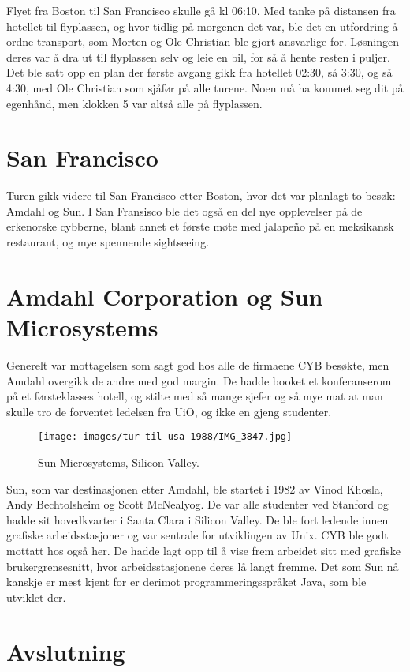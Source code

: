 Flyet fra Boston til San Francisco skulle gå kl 06:10. Med tanke på distansen fra hotellet til flyplassen, og hvor tidlig på morgenen det var, ble det en utfordring å ordne transport, som Morten og Ole Christian ble gjort ansvarlige for. Løsningen deres var å dra ut til flyplassen selv og leie en bil, for så å hente resten i puljer. Det ble satt opp en plan der første avgang gikk fra hotellet 02:30, så 3:30, og så 4:30, med Ole Christian som sjåfør på alle turene. Noen må ha kommet seg dit på egenhånd, men klokken 5 var altså alle på flyplassen.

\section{San Francisco}

Turen gikk videre til San Francisco etter Boston, hvor det var planlagt to besøk: Amdahl og Sun. I San Fransisco ble det også en del nye opplevelser på de erkenorske cybberne, blant annet et første møte med jalapeño på en meksikansk restaurant, og mye spennende sightseeing.

\section{Amdahl Corporation og Sun Microsystems}

Generelt var mottagelsen som sagt god hos alle de firmaene CYB besøkte, men Amdahl overgikk de andre med god margin. De hadde booket et konferanserom på et førsteklasses hotell, og stilte med så mange sjefer og så mye mat at man skulle tro de forventet ledelsen fra UiO, og ikke en gjeng studenter.

\begin{figure}
	\texttt{[image: images/tur-til-usa-1988/IMG\_3847.jpg]}
	\caption{Sun Microsystems, Silicon Valley.}
\end{figure}

Sun, som var destinasjonen etter Amdahl, ble startet i 1982 av Vinod Khosla, Andy Bechtolsheim og Scott McNealyog. De var alle studenter ved Stanford og hadde sit hovedkvarter i Santa Clara i Silicon Valley. De ble fort ledende innen grafiske arbeidsstasjoner og var sentrale for utviklingen av Unix. CYB ble godt mottatt hos også her. De hadde lagt opp til å vise frem arbeidet sitt med grafiske brukergrensesnitt, hvor arbeidsstasjonene deres lå langt fremme. Det som Sun nå kanskje er mest kjent for er derimot programmeringsspråket Java, som ble utviklet der.

\section{Avslutning}

